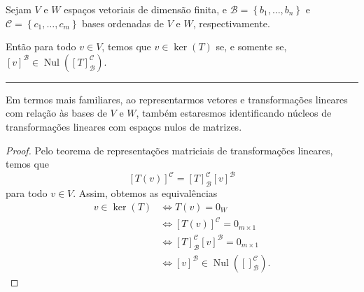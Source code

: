 \begin{theorem}
	Sejam $V$ e $W$ espaços vetoriais de dimensão finita, e $\mathcal{B}=\left\{b_1,\ldots,b_n\right\}$ e $\mathcal{C}=\left\{c_1,\ldots,c_m\right\}$ bases ordenadas de $V$ e $W$, respectivamente.
	
	Então para todo $v\in V$, temos que $v\in\ker(T)$ se, e somente se, $[v]^{\mathcal{B}}\in\operatorname{Nul}(\left[T\right]_{\mathcal{B}}^\mathcal{C})$.
	
	\hrule
	
	Em termos mais familiares, ao representarmos vetores e transformações lineares com relação às bases de $V$ e $W$, também estaresmos identificando núcleos de transformações lineares com espaços nulos de matrizes.
\end{theorem}

\begin{proof}
	Pelo teorema de representações matriciais de transformações lineares, temos que
	\[\left[T(v)\right]^{\mathcal{C}}=\left[T\right]_{\mathcal{B}}^{\mathcal{C}}[v]^{\mathcal{B}}\]
	para todo $v\in V$. Assim, obtemos as equivalências
	\begin{align*}
	v\in\ker(T)
		&\iff T(v)=0_W\\
		&\iff \left[T(v)\right]^{\mathcal{C}}=0_{m\times 1}\\
		&\iff \left[T\right]_{\mathcal{B}}^{\mathcal{C}}[v]^{\mathcal{B}}=0_{m\times 1}\\
		&\iff [v]^{\mathcal{B}}\in\operatorname{Nul}(\left[\right]_{\mathcal{B}}^\mathcal{C}).
	\end{align*}
\end{proof}